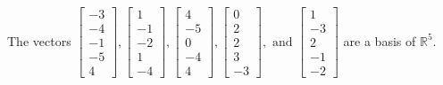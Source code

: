 \begin{exercise}
\begin{exerciseStatement}
  \end{exerciseStatement}
  \begin{exerciseAnswer}
   The vectors \(\left[\begin{array}{r}
-3 \\
-4 \\
-1 \\
-5 \\
4
\end{array}\right] , \left[\begin{array}{r}
1 \\
-1 \\
-2 \\
1 \\
-4
\end{array}\right] , \left[\begin{array}{r}
4 \\
-5 \\
0 \\
-4 \\
4
\end{array}\right] , \left[\begin{array}{r}
0 \\
2 \\
2 \\
3 \\
-3
\end{array}\right] , \text{ and } \left[\begin{array}{r}
1 \\
-3 \\
2 \\
-1 \\
-2
\end{array}\right]\) 
  	 are  a basis of \(\mathbb{R}^5\).
  


  \end{exerciseAnswer}
\end{exercise}